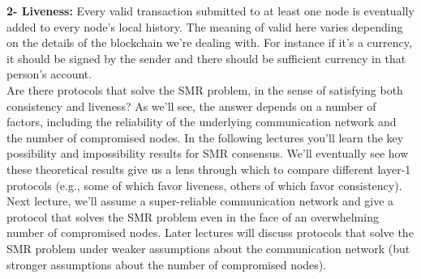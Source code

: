 \noindent
\textbf{2- Liveness:} Every valid transaction submitted to at least one node is eventually added
to every node’s local history. The meaning of valid here varies depending on the details of the blockchain we're dealing with. For instance if it's a currency, it should be signed by the sender and there should be sufficient currency in that person's account.\\
Are there protocols that solve the SMR problem, in the sense of satisfying both consistency and liveness? As we’ll see, the answer depends on a number of factors, including the
reliability of the underlying communication network and the number of compromised nodes.
In the following lectures you’ll learn the key possibility and impossibility results for SMR
consensus. We’ll eventually see how these theoretical results give us a lens through which
to compare different layer-1 protocols (e.g., some of which favor liveness, others of which favor consistency). Next lecture, we’ll assume a super-reliable communication network and
give a protocol that solves the SMR problem even in the face of an overwhelming number of
compromised nodes. Later lectures will discuss protocols that solve the SMR problem under
weaker assumptions about the communication network (but stronger assumptions about the
number of compromised nodes).
